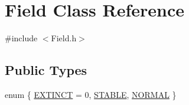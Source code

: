 \hypertarget{classField}{}\section{Field Class Reference}
\label{classField}


{\ttfamily \#include $<$Field.\+h$>$}

\subsection*{Public Types}
\begin{DoxyCompactItemize}
\item 
enum \{ \hyperlink{classField_aa6d508a405365e5a6c0414885e525f0ca56fae498f50c63150db6f0a62f5e1fca}{E\+X\+T\+I\+N\+CT} = 0, 
\hyperlink{classField_aa6d508a405365e5a6c0414885e525f0cabbd2d19da019f8f32b0996513f0a3bf6}{S\+T\+A\+B\+LE}, 
\hyperlink{classField_aa6d508a405365e5a6c0414885e525f0ca4b7abbee7590e23286d7583cb23e24ee}{N\+O\+R\+M\+AL}
 \}
\end{DoxyCompactItemize}
